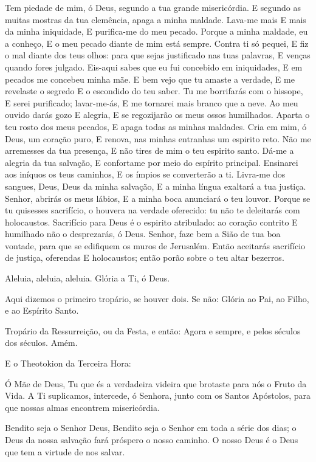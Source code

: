 \documentclass{subfiles}
\begin{document}
Tem piedade de mim, ó Deus, segundo a tua grande misericórdia. E segundo
as muitas mostras da tua clemência, apaga a minha maldade. Lava-me mais E
mais da minha iniquidade, E purifica-me do meu pecado. Porque a minha
maldade, eu a conheço, E o meu pecado diante de mim está sempre. Contra ti
só pequei, E fiz o mal diante dos teus olhos: para que sejas justificado nas tuas
palavras, E venças quando fores julgado. Eis-aqui sabes que eu fui concebido
em iniquidades, E em pecados me concebeu minha mãe. E bem vejo que tu
amaste a verdade, E me revelaste o segredo E o escondido do teu saber. Tu me
borrifarás com o hissope, E serei purificado; lavar-me-ás, E me tornarei mais
branco que a neve. Ao meu ouvido darás gozo E alegria, E se regozijarão os
meus ossos humilhados. Aparta o teu rosto dos meus pecados, E apaga todas
as minhas maldades. Cria em mim, ó Deus, um coração puro, E renova, nas
minhas entranhas um espirito reto. Não me arremesses da tua presença, E não
tires de mim o teu espirito santo. Dá-me a alegria da tua salvação, E confortame por meio do espírito principal. Ensinarei aos iníquos os teus caminhos, E os
ímpios se converterão a ti. Livra-me dos sangues, Deus, Deus da minha
salvação, E a minha língua exaltará a tua justiça. Senhor, abrirás os meus lábios,
E a minha boca anunciará o teu louvor. Porque se tu quisesses sacrifício, o
houvera na verdade oferecido: tu não te deleitarás com holocaustos. Sacrifício
para Deus é o espirito atribulado: ao coração contrito E humilhado não o
desprezarás, ó Deus. Senhor, faze bem a Sião de tua boa vontade, para que se
edifiquem os muros de Jerusalém. Então aceitarás sacrifício de justiça,
oferendas E holocaustos; então porão sobre o teu altar bezerros.

\Doxology{}

Aleluia, aleluia, aleluia. Glória a Ti, ó Deus. \thrice{}

\mercy{} \thrice{}

Aqui dizemos o primeiro tropário, se houver dois. Se não: Glória ao Pai, ao
Filho, e ao Espírito Santo.

Tropário da Ressurreição, ou da Festa, e então: Agora e sempre, e pelos séculos
dos séculos. Amém.

E o Theotokion da Terceira Hora:

Ó Mãe de Deus, Tu que és a verdadeira videira que brotaste para nós
o Fruto da Vida. A Ti suplicamos, intercede, ó Senhora, junto com os Santos
Apóstolos, para que nossas almas encontrem misericórdia.

Bendito seja o Senhor Deus, Bendito seja o Senhor em toda a série dos
dias; o Deus da nossa salvação fará próspero o nosso caminho. O nosso Deus
é o Deus que tem a virtude de nos salvar.
\end{document}
